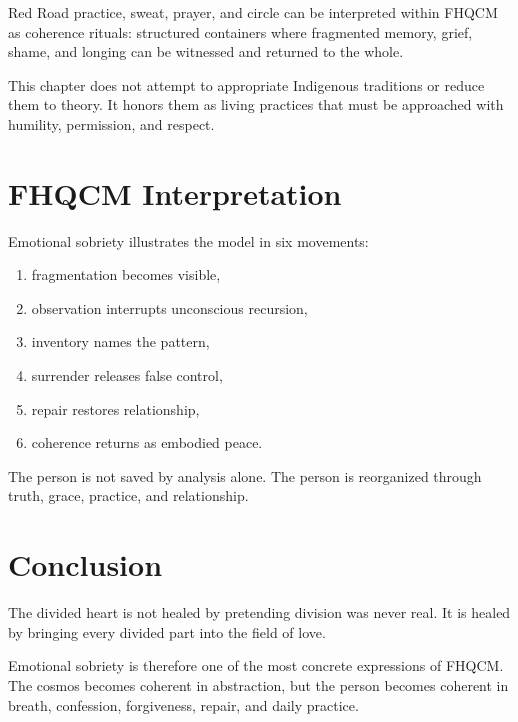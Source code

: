 Red Road practice, sweat, prayer, and circle can be interpreted within FHQCM as coherence rituals: structured containers where fragmented memory, grief, shame, and longing can be witnessed and returned to the whole.

This chapter does not attempt to appropriate Indigenous traditions or reduce them to theory. It honors them as living practices that must be approached with humility, permission, and respect.

\section{FHQCM Interpretation}

Emotional sobriety illustrates the model in six movements:

\begin{enumerate}
\item fragmentation becomes visible,
\item observation interrupts unconscious recursion,
\item inventory names the pattern,
\item surrender releases false control,
\item repair restores relationship,
\item coherence returns as embodied peace.
\end{enumerate}

The person is not saved by analysis alone. The person is reorganized through truth, grace, practice, and relationship.

\section{Conclusion}

The divided heart is not healed by pretending division was never real. It is healed by bringing every divided part into the field of love.

Emotional sobriety is therefore one of the most concrete expressions of FHQCM. The cosmos becomes coherent in abstraction, but the person becomes coherent in breath, confession, forgiveness, repair, and daily practice.

